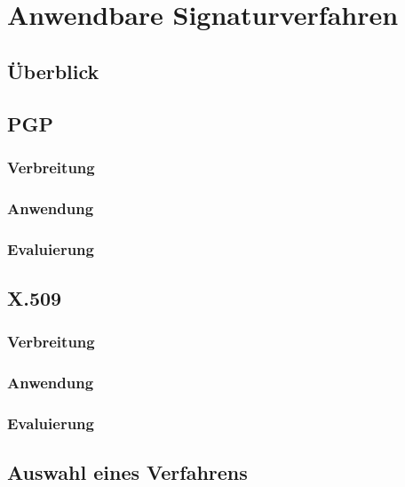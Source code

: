 
\chapter{Anwendbare Signaturverfahren}
\label{chp:Signaturverfahren}

\section{Überblick}

\section{PGP}
%
\label{sec:Signaturverfahren:PGP}%

\subsection{Verbreitung}

\subsection{Anwendung}

\subsection{Evaluierung}

\section{X.509}
%
\label{sec:Signaturverfahren:x509}%

\subsection{Verbreitung}

\subsection{Anwendung}

\subsection{Evaluierung}

\section{Auswahl eines Verfahrens}

